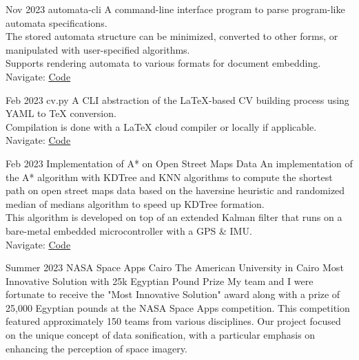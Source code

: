 \documentclass[hidelinks]{report}
\begin{document}
\vspace{2mm}



\entry
    {Nov 2023}
    {automata-cli}
    {} {}
    {
    \textbullet A command-line interface program to parse program-like automata specifications. \\ 
    \textbullet The stored automata structure can be minimized, converted to other forms, or 
    manipulated with user-specified algorithms. \\ 
    \textbullet Supports rendering automata to various formats for document embedding.\\
    \textbullet Navigate: \href{\github/automata-cli}{\underline{Code}}
    }

\entry
    {Feb 2023}
    {cv.py}
    {} {}  
    {
      \textbullet A CLI abstraction of the LaTeX-based CV building process using YAML to TeX conversion.\\
      \textbullet Compilation is done with a LaTeX cloud compiler or locally if applicable.
      \textbullet Navigate: \href{\github/CV.py}{\underline{Code}}
    }

\entry
    {Feb 2023}
    {Implementation of A* on Open Street Maps Data }
    {} {}    
    {
       \textbullet An implementation of the A* algorithm with KDTree and KNN algorithms to compute the shortest path on open street maps data based on the haversine heuristic and randomized median of medians algorithm to speed up KDTree formation.\\
       \textbullet This algorithm is developed on top of an extended Kalman filter that runs on a bare-metal embedded microcontroller with a GPS \& IMU. \\
       \textbullet Navigate: \href{\github/Astar-OSM}{\underline{Code}}
    }


\vspace{2mm}


\entry
    {Summer 2023}
    {NASA Space Apps Cairo}
    {The American University in Cairo }  
    {Most Innovative Solution with 25k Egyptian Pound Prize}
    {
      My team and I were fortunate to receive the "Most Innovative Solution" award along with a prize of 25,000 Egyptian pounds at the NASA Space Apps competition. This competition featured approximately 150 teams from various disciplines. Our project focused on the unique concept of data sonification, with a particular emphasis on enhancing the perception of space imagery.  
    }
    
\end{document}
